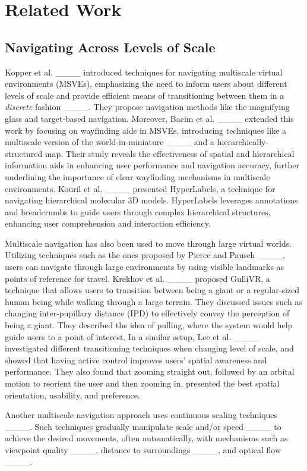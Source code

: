 \section{Related Work}
\subsection{Navigating Across Levels of Scale}
Kopper et al. ____ introduced techniques for navigating multiscale virtual environments (MSVEs), emphasizing the need to inform users about different levels of scale and provide efficient means of transitioning between them in a \textit{discrete} fashion ____. They propose navigation methods like the magnifying glass and target-based navigation. Moreover, Bacim et al. ____ extended this work by focusing on wayfinding aids in MSVEs, introducing techniques like a multiscale version of the world-in-miniature ____ and a hierarchically-structured map. Their study reveals the effectiveness of spatial and hierarchical information aids in enhancing user performance and navigation accuracy, further underlining the importance of clear wayfinding mechanisms in multiscale environments. Kouril et al. ____ presented HyperLabels, a technique for navigating hierarchical molecular 3D models. HyperLabels leverages annotations and breadcrumbs to guide users through complex hierarchical structures, enhancing user comprehension and interaction efficiency.

Multiscale navigation has also been used to move through large virtual worlds. Utilizing techniques such as the ones proposed by Pierce and Pausch ____, users can navigate through large environments by using visible landmarks as points of reference for travel. Krekhov et al. ____ proposed GulliVR, a technique that allows users to transition between being a giant or a regular-sized human being while walking through a large terrain. They discussed issues such as changing inter-pupillary distance (IPD) to effectively convey the perception of being a giant. They described the idea of pulling, where the system would help guide users to a point of interest. In a similar setup, Lee et al. ____ investigated different transitioning techniques when changing level of scale, and showed that having active control improves users' spatial awareness and performance. They also found that zooming straight out, followed by an orbital motion to reorient the user and then zooming in, presented the best spatial orientation, usability, and preference.

Another multiscale navigation approach uses continuous scaling techniques ____. Such techniques gradually manipulate scale and/or speed ____ to achieve the desired movements, often automatically, with mechanisms such as viewpoint quality ____, distance to surroundings ____, and optical flow ____.

